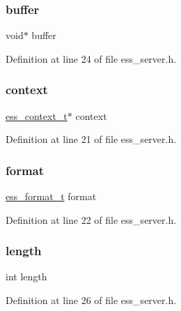 \subsubsection{\texorpdfstring{buffer}{buffer}}
{\footnotesize\ttfamily void$\ast$ buffer}



Definition at line 24 of file ess\+\_\+server.\+h.

\mbox{\label{structess__server_ac7de255331395ee883c238e3fe9838a2}} 
\subsubsection{\texorpdfstring{context}{context}}
{\footnotesize\ttfamily \hyperlink{ess__context_8h_a8a8fec5766c0b3615f8f12f7948e949b}{ess\+\_\+context\+\_\+t}$\ast$ context}



Definition at line 21 of file ess\+\_\+server.\+h.

\mbox{\label{structess__server_abb4395d1c05d3bbc2e1d011507ddd19b}} 
\subsubsection{\texorpdfstring{format}{format}}
{\footnotesize\ttfamily \hyperlink{ess__format_8h_a9aa23f58a25b9e8360c1400e0cadfd80}{ess\+\_\+format\+\_\+t} format}



Definition at line 22 of file ess\+\_\+server.\+h.

\mbox{\label{structess__server_a9f59b34b1f25fe00023291b678246bcc}} 
\subsubsection{\texorpdfstring{length}{length}}
{\footnotesize\ttfamily int length}



Definition at line 26 of file ess\+\_\+server.\+h.

